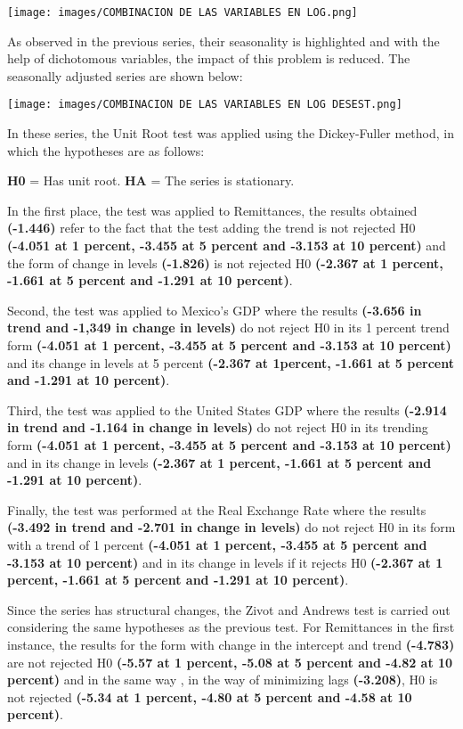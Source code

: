 \documentclass[12pt,english, spanish]{smfart}
\begin{document}
  \texttt{[image: images/COMBINACION DE LAS VARIABLES EN LOG.png]}
 
As observed in the previous series, their seasonality is highlighted and with the help of dichotomous variables, the impact of this problem is reduced. The seasonally adjusted  
series are shown below:\par

   \texttt{[image: images/COMBINACION DE LAS VARIABLES EN LOG DESEST.png]}
   
In these series, the Unit Root test was applied using the Dickey-Fuller method, in which the hypotheses are as follows:\par
\begin{center}
\textbf{H0} = Has unit root.
\textbf{HA} = The series is stationary.
\end{center}
In the first place, the test was applied to Remittances, the results obtained \textbf{(-1.446)} refer to the fact that the test adding the trend is not rejected H0 \textbf{(-4.051 at 1 percent, -3.455 at 5 percent and -3.153 at 10 percent)} and the form of change in levels \textbf{(-1.826)} is not rejected H0 \textbf{(-2.367 at 1 percent, -1.661 at 5 percent and -1.291 at 10 percent)}. \par
Second, the test was applied to Mexico's GDP where the results \textbf{(-3.656 in trend and -1,349 in change in levels)} do not reject H0 in its 1 percent trend form \textbf{(-4.051 at 1 percent, -3.455 at 5 percent and -3.153 at 10 percent)} and its change in levels at 5 percent \textbf{(-2.367 at 1percent, -1.661 at 5 percent and -1.291 at 10 percent)}.\par
Third, the test was applied to the United States GDP where the results \textbf{(-2.914 in trend and -1.164 in change in levels)} do not reject H0 in its trending form \textbf{(-4.051 at 1 percent, -3.455 at 5 percent and -3.153 at 10 percent)} and in its change in levels \textbf{(-2.367 at 1 percent, -1.661 at 5 percent and -1.291 at 10 percent)}.\par 
Finally, the test was performed at the Real Exchange Rate where the results \textbf{(-3.492 in trend and -2.701 in change in levels)} do not reject H0 in its form with a trend of 1 percent \textbf{(-4.051 at 1 percent, -3.455 at 5 percent and -3.153 at 10 percent)} and in its change in levels if it rejects H0 \textbf{(-2.367 at 1 percent, -1.661 at 5 percent and -1.291 at 10 percent)}.\par
Since the series has structural changes, the Zivot and Andrews test is carried out considering the same hypotheses as the previous test. For Remittances in the first instance, the results for the form with change in the intercept and trend \textbf{(-4.783)} are not rejected H0 \textbf{(-5.57 at 1 percent, -5.08 at 5 percent and -4.82 at 10 percent)} and in the same way , in the way of minimizing lags \textbf{(-3.208)}, H0 is not rejected \textbf{(-5.34 at 1 percent, -4.80 at 5 percent and -4.58 at 10 percent)}.\par
\end{document}
